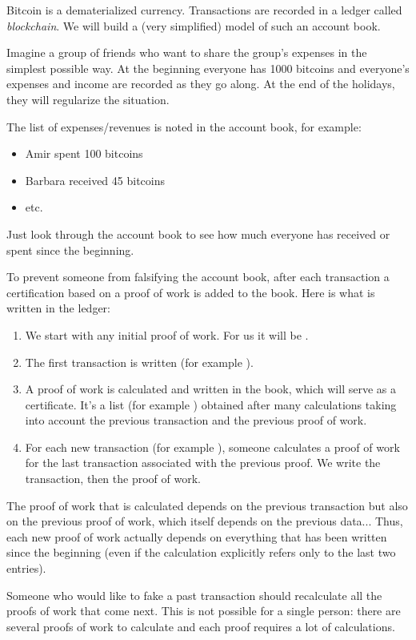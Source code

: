\documentclass[11pt,class=report,crop=false]{standalone}
\begin{document}

\begin{cours}

Bitcoin is a dematerialized currency. Transactions are recorded in a ledger called \emph{blockchain}. We will build a (very simplified) model of such an account book.


Imagine a group of friends who want to share the group's expenses in the simplest possible way. At the beginning everyone has 1000 bitcoins and everyone's expenses and income are recorded as they go along. 
At the end of the holidays, they will regularize the situation.

The list of expenses/revenues is noted in the account book, for example:
\begin{itemize}
  \item \og{}Amir spent 100 bitcoins\fg{}
  \item \og{}Barbara received 45 bitcoins\fg{}
  \item etc.
\end{itemize}
Just look through the account book to see how much everyone has received or spent since the beginning.

\bigskip

To prevent someone from falsifying the account book, after each transaction a certification based on a \og{}proof of work\fg{} is added to the book.
Here is what is written in the ledger:
\begin{enumerate}
  \item We start with any initial proof of work. For us it will be 
  \ci{[0,0,0,0,0,0]}.
  \item The first transaction is written (for example ).
  \item A proof of work is calculated and written in the book, which will serve as a certificate. It's a list
  (for example \ci{[56,42,10,98,2,34]}) obtained after many calculations taking into account the previous transaction and the previous proof of work.
  \item For each new transaction (for example ), someone calculates a proof of work for the last transaction associated with the previous proof. We write the transaction, then the proof of work.
\end{enumerate}



The proof of work that is calculated depends on the previous transaction but also on the previous proof of work, which itself depends on the previous data... Thus, each new proof of work actually depends on everything that has been written since the beginning (even if the calculation explicitly refers only to the last two entries).

Someone who would like to fake a past transaction should recalculate all the proofs of work that come next. This is not possible for a single person: there are several proofs of work to calculate and each proof requires a lot of calculations.
\end{cours}
\end{document}
